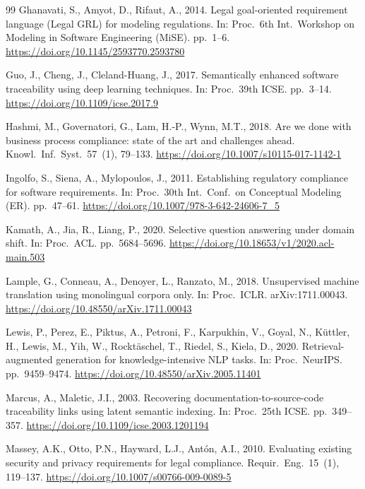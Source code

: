 \documentclass[smallextended,natbib]{svjour3}
\begin{document}
\begin{thebibliography}{99}
Ghanavati, S., Amyot, D., Rifaut, A., 2014. Legal goal-oriented requirement language (Legal GRL) for modeling regulations. In: Proc.\ 6th Int.\ Workshop on Modeling in Software Engineering (MiSE). pp.\ 1--6. \url{https://doi.org/10.1145/2593770.2593780}

Guo, J., Cheng, J., Cleland-Huang, J., 2017. Semantically enhanced software traceability using deep learning techniques. In: Proc.\ 39th ICSE. pp.\ 3--14. \url{https://doi.org/10.1109/icse.2017.9}

Hashmi, M., Governatori, G., Lam, H.-P., Wynn, M.T., 2018. Are we done with business process compliance: state of the art and challenges ahead. Knowl.\ Inf.\ Syst.\ 57~(1), 79--133. \url{https://doi.org/10.1007/s10115-017-1142-1}

Ingolfo, S., Siena, A., Mylopoulos, J., 2011. Establishing regulatory compliance for software requirements. In: Proc.\ 30th Int.\ Conf.\ on Conceptual Modeling (ER). pp.\ 47--61. \url{https://doi.org/10.1007/978-3-642-24606-7_5}

Kamath, A., Jia, R., Liang, P., 2020. Selective question answering under domain shift. In: Proc.\ ACL. pp.\ 5684--5696. \url{https://doi.org/10.18653/v1/2020.acl-main.503}

Lample, G., Conneau, A., Denoyer, L., Ranzato, M., 2018. Unsupervised machine translation using monolingual corpora only. In: Proc.\ ICLR. arXiv:1711.00043. \url{https://doi.org/10.48550/arXiv.1711.00043}

Lewis, P., Perez, E., Piktus, A., Petroni, F., Karpukhin, V., Goyal, N., K\"uttler, H., Lewis, M., Yih, W., Rockt\"aschel, T., Riedel, S., Kiela, D., 2020. Retrieval-augmented generation for knowledge-intensive NLP tasks. In: Proc.\ NeurIPS. pp.\ 9459--9474. \url{https://doi.org/10.48550/arXiv.2005.11401}

Marcus, A., Maletic, J.I., 2003. Recovering documentation-to-source-code traceability links using latent semantic indexing. In: Proc.\ 25th ICSE. pp.\ 349--357. \url{https://doi.org/10.1109/icse.2003.1201194}

Massey, A.K., Otto, P.N., Hayward, L.J., Ant\'on, A.I., 2010. Evaluating existing security and privacy requirements for legal compliance. Requir.\ Eng.\ 15~(1), 119--137. \url{https://doi.org/10.1007/s00766-009-0089-5}


\end{thebibliography}
\end{document}
